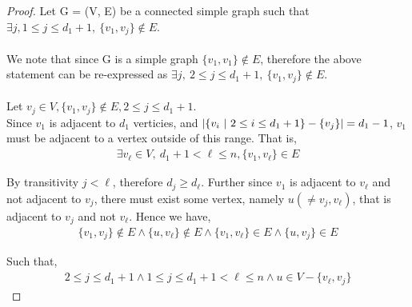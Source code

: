 \documentclass[12pt]{article}
\newenvironment{question}[2][Question]{\begin{trivlist}
\item[\hskip \labelsep {\bfseries #1}\hskip \labelsep {\bfseries #2.}]}{\end{trivlist}}
\DeclarePairedDelimiter\abs{\lvert}{\rvert}%
\begin{document}
\begin{question}{3 (a)}
  \leavevmode
  \begin{proof}
    Let G = (V, E) be a connected simple graph such that $\exists j, 1 \leq j \leq d_{1} + 1,\ \{v_{1}, v_{j}\} \notin E$. \\ \\
    We note that since G is a simple graph $\{v_{1}, v_{1}\} \notin E$, therefore the above statement can be re-expressed
    as $\exists j,\ 2 \leq j \leq d_{1} + 1,\ \{v_{1}, v_{j}\} \notin E$. \\ \\
    Let $v_{j} \in V, \{v_{1}, v_{j}\} \notin E, 2 \leq j \leq d_{1} + 1$. \\
    Since $v_{1}$ is adjacent to $d_{1}$ verticies, and $\abs{\{v_{i}\ |\ 2 \leq i \leq d_{1} + 1\} - \{v_{j}\}} = d_{1} - 1$,
    $v_{1}$ must be adjacent to a vertex outside of this range.  That is,
    \begin{align*}
      \exists v_{\ell} \in V,\ d_{1} + 1 < \ell \leq n, \{v_{1}, v_{\ell}\} \in E
    \end{align*}

    By transitivity $j < \ell$, therefore $d_{j} \geq d_{\ell}$.  Further since
    $v_{1}$ is adjacent to $v_{\ell}$ and not adjacent to $v_{j}$,
    there must exist some vertex, namely $u (\neq v_{j}, v_{\ell})$,
    that is adjacent to $v_{j}$ and not $v_{\ell}$. Hence we have,
    \begin{align*}
      \{v_{1}, v_{j}\} \notin E \land \{u, v_{\ell}\} \notin E \land
      \{v_{1}, v_{\ell}\} \in E \land \{u, v_{j}\} \in E
    \end{align*}

    Such that,
    \begin{align*}
      2 \leq j \leq d_{1}+1 \land 1 \leq j \leq d_{1} + 1 < \ell \leq n \land u \in V - \{v_{\ell}, v_{j}\}
    \end{align*}
  \end{proof}
\end{question}
\end{document}

